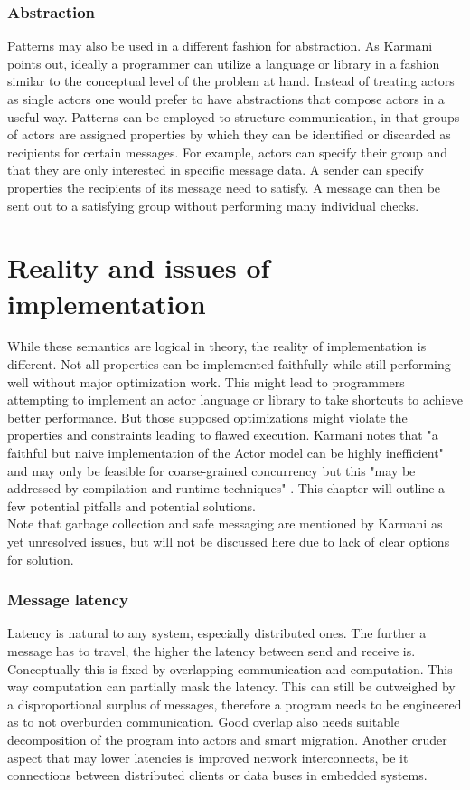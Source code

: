 \documentclass[A4]{article}
\begin{document}
\subsubsection{Abstraction}
Patterns may also be used in a different fashion for abstraction. As Karmani points out, ideally a programmer can utilize a language or library in a fashion similar to the conceptual level of the problem at hand. Instead of treating actors as single actors one would prefer to have abstractions that compose actors in a useful way. \cite[p.~7]{reference/parallel/KarmaniA11}
Patterns can be employed to structure communication, in that groups of actors are assigned properties by which they can be identified or discarded as recipients for certain messages. For example, actors can specify their group and that they are only interested in specific message data. A sender can specify properties the recipients of its message need to satisfy. A message can then be sent out to a satisfying group without performing many individual checks. 

\section{Reality and issues of implementation}
While these semantics are logical in theory, the reality of implementation is different. Not all properties can be implemented faithfully while still performing well without major optimization work. This might lead to programmers attempting to implement an actor language or library to take shortcuts to achieve better performance. But those supposed optimizations might violate the properties and constraints leading to flawed execution. Karmani notes that "a faithful but naive implementation of the Actor model can be highly inefficient" \cite[p.~8]{reference/parallel/KarmaniA11} and may only be feasible for coarse-grained concurrency \cite[p.~7]{conf/pppj/KarmaniSA09} but this "may be addressed by compilation and runtime techniques" \cite[p.~8]{reference/parallel/KarmaniA11}. This chapter will outline a few potential pitfalls and potential solutions. \\
Note that garbage collection and safe messaging are mentioned by Karmani as yet unresolved issues\cite[p.~10]{conf/pppj/KarmaniSA09}, but will not be discussed here due to lack of clear options for solution.
\subsubsection{Message latency}
Latency is natural to any system, especially distributed ones. The further a message has to travel, the higher the latency between send and receive is. 
Conceptually this is fixed by overlapping communication and computation. This way computation can partially mask the latency. This can still be outweighed by a disproportional surplus of messages, therefore a program needs to be engineered as to not overburden communication. Good overlap also needs suitable decomposition of the program into actors and smart migration. \cite[p.~8]{reference/parallel/KarmaniA11}
Another cruder aspect that may lower latencies is improved network interconnects, be it connections between distributed clients or data buses in embedded systems. 
\end{document}
